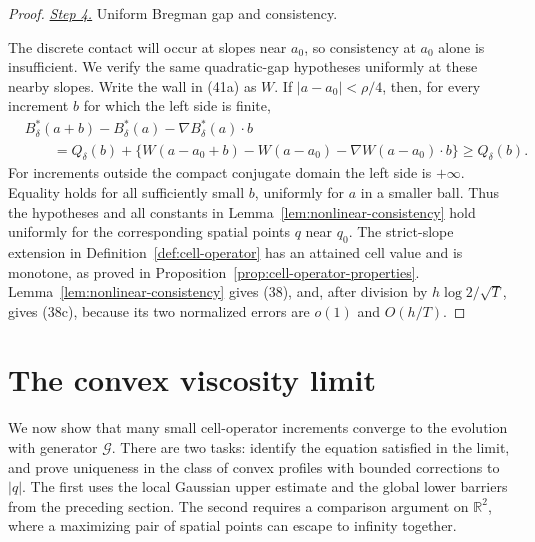 \documentclass{smfart}
\theoremstyle{definition}
\newcommand{\1}{\mathbf 1}
\begin{document}
\begin{proof}
\smallskip\noindent
\underline{\textit{Step 4.}} Uniform Bregman gap and consistency.

The discrete contact will occur at slopes near $a_0$, so consistency
at $a_0$ alone is insufficient.  We verify the same quadratic-gap
hypotheses uniformly at these nearby slopes.  Write the wall in
(41a) as $W$.  If $|a-a_0|<\rho/4$, then, for every increment
$b$ for which the left side is finite,
\begin{equation}
\begin{split}
&B_ \delta^*(a+b)-B_ \delta^*(a)
-\nabla B_ \delta^*(a)\cdot b\\
&\qquad=Q_ \delta(b)+
\{W(a-a_ 0+b)-W(a-a_ 0)-\nabla W(a-a_ 0)\cdot b\}
\geq Q_ \delta(b).                                             
\end{split}
\tag{41e}
\end{equation}
For increments outside the compact conjugate domain the left side is
$+\infty$.  Equality holds for all sufficiently small $b$,
uniformly for $a$ in a smaller ball.  Thus the hypotheses and all
constants in Lemma~\ref{lem:nonlinear-consistency} hold uniformly for the
corresponding spatial points $q$ near $q_ 0$.  The strict-slope
extension in Definition~\ref{def:cell-operator} has an attained cell
value and is monotone, as proved in Proposition~\ref{prop:cell-operator-properties}.  Lemma~\ref{lem:nonlinear-consistency} gives
(38), and, after division by $h\log2/\sqrt T$, gives (38c), because
its two normalized errors are $o(1)$ and $O(h/T)$.

\end{proof}

\section{The convex viscosity limit}\label{sec:viscosity}

We now show that many small cell-operator increments converge to the
evolution with generator $\mathcal G$.  There are two tasks: identify
the equation satisfied in the limit, and prove uniqueness in the class
of convex profiles with bounded corrections to $|q|$.  The first uses
the local Gaussian upper estimate and the global lower barriers from
the preceding section.  The second requires a comparison argument on
$\mathbb R^2$, where a maximizing pair of spatial points can escape
to infinity together.
\end{document}

